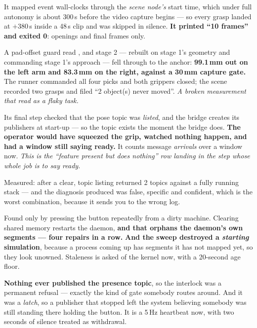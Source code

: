 {It mapped event wall-clocks through the \emph{scene node's} start time, which
under full autonomy is about 300\,s before the video capture begins --- so every
grasp landed at $+380$\,s inside a 48\,s clip and was skipped in silence.
\textbf{It printed ``10 frames'' and exited 0}: openings and final frames only.}

{A pad-offset guard read , and stage 2 --- rebuilt on
stage 1's geometry and commanding stage 1's approach --- fell through to the
anchor: \textbf{99.1\,mm out on the left arm and 83.3\,mm on the right, against a
30\,mm capture gate.} The runner commanded all four picks and both grippers
closed; the scene recorded two grasps and filed ``2 object(s) never moved''.
\emph{A broken measurement that read as a flaky task.}}

{Its final step checked that the pose topic was \emph{listed}, and the bridge
creates its publishers at start-up --- so the topic exists the moment the bridge
does. \textbf{The operator would have squeezed the grip, watched nothing happen,
and had a window still saying ready.} It counts message \emph{arrivals} over a
window now. \emph{This is the ``feature present but does nothing'' row landing in
the step whose whole job is to say ready.}}

{Measured: after a clear, topic listing returned 2 topics against a fully running
stack --- and the diagnosis produced was false, specific and confident, which is
the worst combination, because it sends you to the wrong log.}

{Found only by pressing the button repeatedly from a dirty machine. Clearing
shared memory restarts the daemon, \textbf{and that orphans the daemon's own
segments --- four repairs in a row.} \textbf{And the sweep destroyed a
\emph{starting} simulation}, because a process coming up has segments it has not
mapped yet, so they look unowned. Staleness is asked of the kernel now, with a
20-second age floor.}

{\textbf{Nothing ever published the presence topic}, so the interlock was a
permanent refusal --- exactly the kind of gate somebody routes around. And it was
a \emph{latch}, so a publisher that stopped left the system believing somebody
was still standing there holding the button. It is a 5\,Hz heartbeat now, with
two seconds of silence treated as withdrawal.}

